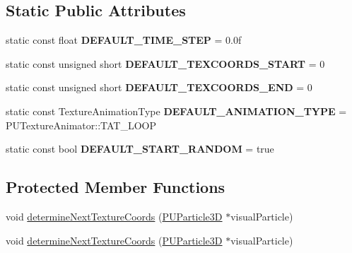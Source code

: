 \subsection*{Static Public Attributes}
\begin{DoxyCompactItemize}
\item 
\mbox{\label{classPUTextureAnimator_a5ab160e7b39183bb8f2f51e4a81060b1}} 
static const float {\bfseries D\+E\+F\+A\+U\+L\+T\+\_\+\+T\+I\+M\+E\+\_\+\+S\+T\+EP} = 0.\+0f
\item 
\mbox{\label{classPUTextureAnimator_a0cafa4138db14310c1520373db63ce5d}} 
static const unsigned short {\bfseries D\+E\+F\+A\+U\+L\+T\+\_\+\+T\+E\+X\+C\+O\+O\+R\+D\+S\+\_\+\+S\+T\+A\+RT} = 0
\item 
\mbox{\label{classPUTextureAnimator_a6c9137d90dc2986a027e412ff935b008}} 
static const unsigned short {\bfseries D\+E\+F\+A\+U\+L\+T\+\_\+\+T\+E\+X\+C\+O\+O\+R\+D\+S\+\_\+\+E\+ND} = 0
\item 
\mbox{\label{classPUTextureAnimator_ad18da72712e874ef22520a6c11ff3573}} 
static const Texture\+Animation\+Type {\bfseries D\+E\+F\+A\+U\+L\+T\+\_\+\+A\+N\+I\+M\+A\+T\+I\+O\+N\+\_\+\+T\+Y\+PE} = P\+U\+Texture\+Animator\+::\+T\+A\+T\+\_\+\+L\+O\+OP
\item 
\mbox{\label{classPUTextureAnimator_a0685bc5132c043d001505d6af0548c4d}} 
static const bool {\bfseries D\+E\+F\+A\+U\+L\+T\+\_\+\+S\+T\+A\+R\+T\+\_\+\+R\+A\+N\+D\+OM} = true
\end{DoxyCompactItemize}
\subsection*{Protected Member Functions}
\begin{DoxyCompactItemize}
\item 
void \hyperlink{classPUTextureAnimator_ac5fc99a0f3da0295beb89fb8c08440cd}{determine\+Next\+Texture\+Coords} (\hyperlink{structPUParticle3D}{P\+U\+Particle3D} $\ast$visual\+Particle)
\item 
void \hyperlink{classPUTextureAnimator_ac5fc99a0f3da0295beb89fb8c08440cd}{determine\+Next\+Texture\+Coords} (\hyperlink{structPUParticle3D}{P\+U\+Particle3D} $\ast$visual\+Particle)
\end{DoxyCompactItemize}
